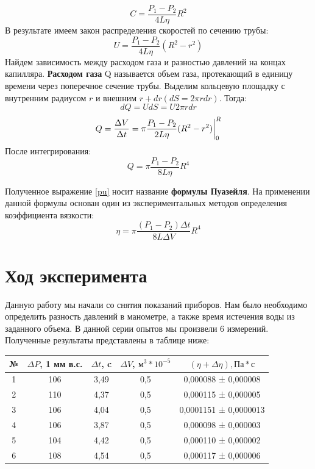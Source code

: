 \documentclass[a4paper,12pt]{article}
\begin{document}
$$C = \frac{P_1 - P_2}{4L\eta}R^2$$
В результате имеем закон распределения скоростей по сечению трубы:
\begin{equation}\label{distrib}
U = \frac{P_1 - P_2}{4L\eta}(R^2-r^2)
\end{equation}
Найдем зависимость между расходом газа и разностью давлений на
концах капилляра. \textbf{Расходом газа} Q называется объем газа, протекающий в единицу времени через поперечное сечение трубы.
Выделим кольцевую площадку с внутренним радиусом $r$ и внешним $r + dr (dS = 2\pi rdr)$. Тогда:
$$dQ = UdS = U2\pi rdr$$
$$Q = \frac{\Delta V}{\Delta t} = \pi\frac{P_1 - P_2}{2L\eta}(R^2-r^2)\bigg|_0^R \vspace{0.2cm}$$
После интегрирования:
\begin{equation}\label{pu}
Q = \pi\frac{P_1 - P_2}{8L\eta}R^4
\end{equation}

Полученное выражение \eqref{pu} носит название \textbf{формулы Пуазейля}. На применении данной формулы основан один из экспериментальных методов определения коэффициента вязкости:
\begin{equation}
\eta = \pi\frac{(P_1-P_2)\Delta t}{8L\Delta V}R^4
\end{equation}

\newpage
\section{Ход эксперимента}
\hspace{\parindent}Данную работу мы начали со снятия показаний приборов. Нам было необходимо определить разность давлений в манометре, а также время истечения воды из заданного объема. В данной серии опытов мы произвели 6 измерений. Полученные результаты представлены в таблице ниже:


\begin{center}
	\begin{tabular}{|c|c|c|c|c|} 
		\hline

		№&$\Delta P$, 1 мм в.с.&$\Delta t$, c&$\Delta V$, ${м^3}*10^{-5}$&$(\eta +\Delta\eta), Па*с$\\
		\hline
		1& 106 & 3,49 & 0,5 & 0,000088 ± 0,000008
		\\
		2& 110 & 4,37 & 0,5 & 0,000115 ± 0,000005
		\\
		3& 106 & 4,04 & 0,5 & 0,0001151 ± 0,0000013
		\\
		4& 106 & 3,87 & 0,5 & 0,000098 ± 0,000003
		\\
		5& 104 & 4,42 & 0,5 & 0,000110 ± 0,000002
		\\ 
		6& 108 & 4,54 & 0,5 & 0,000117 ± 0,000006
		\\
		\hline
	\end{tabular}
\end{center}
\end{document}
